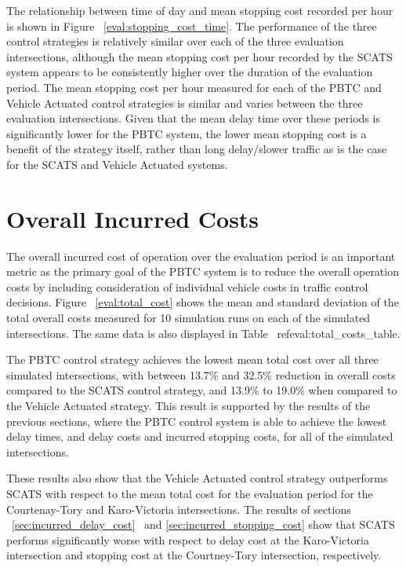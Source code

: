 The relationship between time of day and mean stopping cost recorded per hour is shown in Figure ~\ref{eval:stopping_cost_time}. The performance of the three control strategies is relatively similar over each of the three evaluation intersections, although the mean stopping cost per hour recorded by the SCATS system appears to be consistently higher over the duration of the evaluation period. The mean stopping cost per hour measured for each of the PBTC and Vehicle Actuated control strategies is similar and varies between the three evaluation intersections. Given that the mean delay time over these periods is significantly lower for the PBTC system, the lower mean stopping cost is a benefit of the strategy itself, rather than long delay/slower traffic as is the case for the SCATS and Vehicle Actuated systems.

\section{Overall Incurred Costs}

The overall incurred cost of operation over the evaluation period is an important metric as the primary goal of the PBTC system is to reduce the overall operation costs by including consideration of individual vehicle costs in traffic control  decisions. Figure ~\ref{eval:total_cost} shows the mean and standard deviation of the total overall costs measured for 10 simulation runs on each of the simulated intersections. The same data is also displayed in Table ~ref{eval:total_costs_table}.

The PBTC control strategy achieves the lowest mean total cost over all three simulated intersections, with between 13.7\% and 32.5\% reduction in overall costs compared to the SCATS control strategy, and 13.9\% to 19.0\% when compared to the Vehicle Actuated strategy. This result is supported by the results of the previous sections, where the PBTC control system is able to achieve the lowest delay times, and delay costs and incurred stopping costs, for all of the simulated intersections. 

These results also show that the Vehicle Actuated control strategy outperforms SCATS with respect to the mean total cost for the evaluation period for the Courtenay-Tory and Karo-Victoria intersections. The results of sections ~\ref{sec:incurred_delay_cost}~ and \ref{sec:incurred_stopping_cost} show that SCATS performs significantly worse with respect to delay cost at the Karo-Victoria intersection and stopping cost at the Courtney-Tory intersection, respectively.

